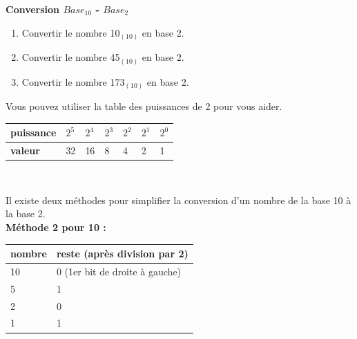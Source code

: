 \begin{Exercice}[5 minutes]  \textbf{Conversion $Base_{10}$ - $Base_2$}\\
    \begin{enumerate}
        \item Convertir le nombre 10$_{(10)}$ en base 2.
        \item Convertir le nombre 45$_{(10)}$ en base 2.
        \item Convertir le nombre 173$_{(10)}$ en base 2.
    \end{enumerate}

    \begin{conseil}
        Vous pouvez utiliser la table des puissances de 2 pour vous aider. \\
        
        \begin{tabular}{| C{0.15\textwidth} | C{0.1\textwidth} | C{0.1\textwidth} | C{0.1\textwidth} | C{0.1\textwidth} | C{0.1\textwidth} | C{0.1\textwidth} |} 
            \hline
            \textbf{puissance} & $2^{5}$ & $2^{4}$ & $2^{3}$ & $2^{2}$ & $2^{1}$ & $2^{0}$ \\ [0.5ex] 
            \hline
            \textbf{valeur} & 32 & 16 & 8 & 4 & 2 & 1 \\ [0.5ex] 
            \hline
        \end{tabular} \\
        
    \end{conseil}

    \begin{solution}
    Il existe deux méthodes pour simplifier la conversion d'un nombre de la base 10 à la base 2.  \\
        
    \textbf{Méthode 2 pour 10 :}
        \medskip
        \begin{tabular}{| C{0.19\textwidth} | C{0.55\textwidth} |} 
        \hline
        \textbf{nombre} & \textbf{reste (après division par 2)}\\ [0.5ex]
         &  0 (1er bit de droite à gauche) \\ [0.5ex] 
         & 1 \\ [0.5ex] 
         & 0 \\ [0.5ex] 
         & 1 \\ [0.5ex] 
        \hline
        \end{tabular}


\end{solution}
\end{Exercice}
